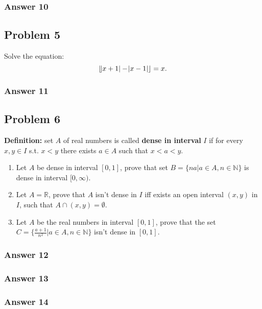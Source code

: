 \documentclass[11pt]{article}
\begin{document}
\subsubsection{Answer 10}
\label{sec-1-4-5}
\subsection{Problem 5}
\label{sec-1-5}
Solve the equation:
\begin{equation*}
   \lfloor \abs{x+1}-\abs{x-1} \rfloor = x.
\end{equation*}


\subsubsection{Answer 11}
\label{sec-1-5-1}
\subsection{Problem 6}
\label{sec-1-6}
\textbf{Definition:} set $A$ of real numbers is called \textbf{dense in interval} $I$ if
for every $x, y \in I$ s.t. $x < y$ there exists $a \in A$ such that
$x < a < y$.

\begin{enumerate}
\item Let $A$ be dense in interval $[0,1]$, prove that set 
      $B=\{na|a \in A, n \in \mathbb{N}\}$ is dense in interval $[0, \infty)$.
\item Let $A=\mathbb{R}$, prove that $A$ isn't dense in $I$ iff exists an
open interval $(x, y)$ in $I$, such that $A \cap (x, y) = \emptyset$.
\item Let $A$ be the real numbers in interval $[0,1]$, prove that the set
      $C=\{\frac{a+1}{n^2} | a \in A, n \in \mathbb{N}\}$ isn't dense in
      $[0,1]$.
\end{enumerate}

\subsubsection{Answer 12}
\label{sec-1-6-1}
\subsubsection{Answer 13}
\label{sec-1-6-2}
\subsubsection{Answer 14}
\label{sec-1-6-3}
\end{document}
